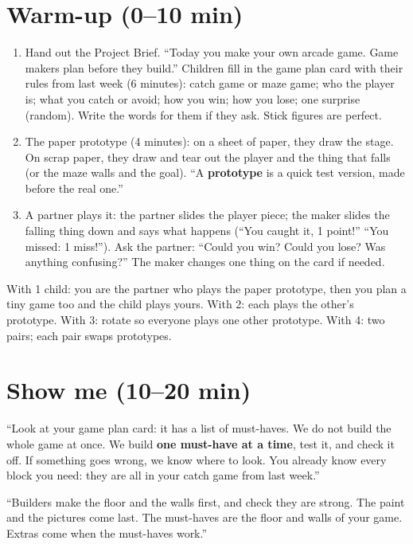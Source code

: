 \section{Warm-up (0--10 min)}
\begin{unplugged}
\begin{enumerate}[leftmargin=1.4em,itemsep=1pt]
  \item Hand out the Project Brief. \enquote{Today you make your own arcade game. Game makers plan before they build.} Children fill in the game plan card with their rules from last week (6 minutes): catch game or maze game; who the player is; what you catch or avoid; how you win; how you lose; one surprise (random). Write the words for them if they ask. Stick figures are perfect.
  \item The paper prototype (4 minutes): on a sheet of paper, they draw the stage. On scrap paper, they draw and tear out the player and the thing that falls (or the maze walls and the goal). \enquote{A \textbf{prototype} is a quick test version, made before the real one.}
  \item A partner plays it: the partner slides the player piece; the maker slides the falling thing down and says what happens (\enquote{You caught it, 1 point!} \enquote{You missed: 1 miss!}). Ask the partner: \enquote{Could you win? Could you lose? Was anything confusing?} The maker changes one thing on the card if needed.
\end{enumerate}
With 1 child: you are the partner who plays the paper prototype, then you plan a tiny game too and the child plays yours. With 2: each plays the other's prototype. With 3: rotate so everyone plays one other prototype. With 4: two pairs; each pair swaps prototypes.
\end{unplugged}

\section{Show me (10--20 min)}
\begin{teacherscript}
\enquote{Look at your game plan card: it has a list of must-haves. We do not build the whole game at once. We build \textbf{one must-have at a time}, test it, and check it off. If something goes wrong, we know where to look. You already know every block you need: they are all in your catch game from last week.}
\end{teacherscript}

\begin{analogy}
\enquote{Builders make the floor and the walls first, and check they are strong. The paint and the pictures come last. The must-haves are the floor and walls of your game. Extras come when the must-haves work.}
\end{analogy}


